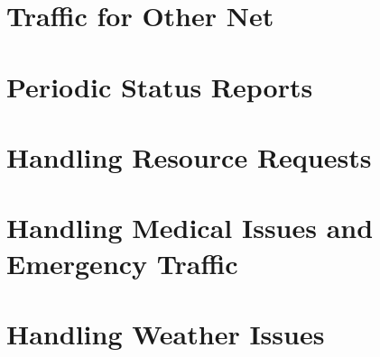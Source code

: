 \documentclass[pdflatex,letterpaper,twoside,12pt]{book}
\begin{document}
\section{Traffic for Other Net}


\section{Periodic Status Reports}


\section{Handling Resource Requests}


\section{Handling Medical Issues and Emergency Traffic}

\iffalse %
We want to change emergencies.. No longer will we hold traffic for nets. We need 
to get back to the "Break Break" for emergency traffic, which then we hold only 
for the traffic, not until the ER is rectified. We need to work  HARD on getting 
Medical onto their own freq. and allowing logistics to handle the ER Dispatch, 
etc. We will be having a meeting in January with Leisha and Dave Polaski in 
regards. Wold like you to be there also. More to come here as we get closer, but 
Were taking control and selling the idea direct to Dave to get his buy in and 
push on Dennis. no more Dennis pushing us around. They need to do their job too!
\fi %


\section{Handling Weather Issues}
\end{document}
